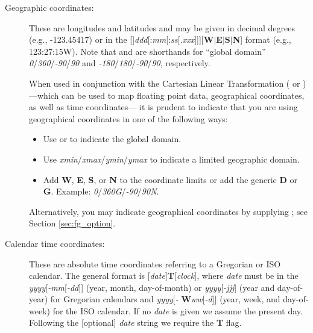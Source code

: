 \begin{description}
\item [Geographic coordinates:]  These are longitudes and latitudes and may be given in decimal degrees (e.g., -123.45417)
or in the
[\PM]\emph{ddd}[:\emph{mm}[:\emph{ss}[\emph{.xxx}]]][\textbf{W}$|$\textbf{E}$|$\textbf{S}$|$\textbf{N}]
format (e.g., 123:27:15W).  Note that  and  are shorthands for ``global domain''
\emph{0}/\emph{360}/\emph{-90}/\emph{90}
and  \emph{-180}/\emph{180}/\emph{-90}/\emph{90}, respectively.

When used in conjunction with the Cartesian Linear Transformation ( or ) ---which can be used
to map floating point data, geographical coordinates, as well as time coordinates--- it is prudent to indicate
that you are using geographical coordinates in one of the following ways:
\begin{itemize}
\item Use  or  to indicate the global domain.
\item Use \emph{xmin}/\emph{xmax}/\emph{ymin}/\emph{ymax} to indicate a limited geographic domain.
\item Add \textbf{W}, \textbf{E}, \textbf{S}, or \textbf{N} to the coordinate limits or add the generic \textbf{D} or
\textbf{G}. Example: \emph{0}/\emph{360G}/\emph{-90}/\emph{90N}.
\end{itemize}
Alternatively, you may indicate geographical coordinates by supplying ; see Section \ref{sec:fg_option}.
\item [Calendar time coordinates:]  These are absolute time coordinates referring to a Gregorian or ISO calendar.
The general format is [\emph{date}]\textbf{T}[\emph{clock}], where \emph{date} must be in the
\emph{yyyy}[\emph{-mm}[\emph{-dd}]] (year, month, day-of-month)
or \emph{yyyy}[\emph{-jjj}] (year and day-of-year) for Gregorian calendars and \emph{yyyy}[\emph{-}{\bf
W}\emph{ww}[\emph{-d}]] (year, week, and
day-of-week) for the ISO calendar.  If no \emph{date} is given we assume the present day.  Following the
[optional] \emph{date} string we require the \textbf{T} flag.


\end{description}
